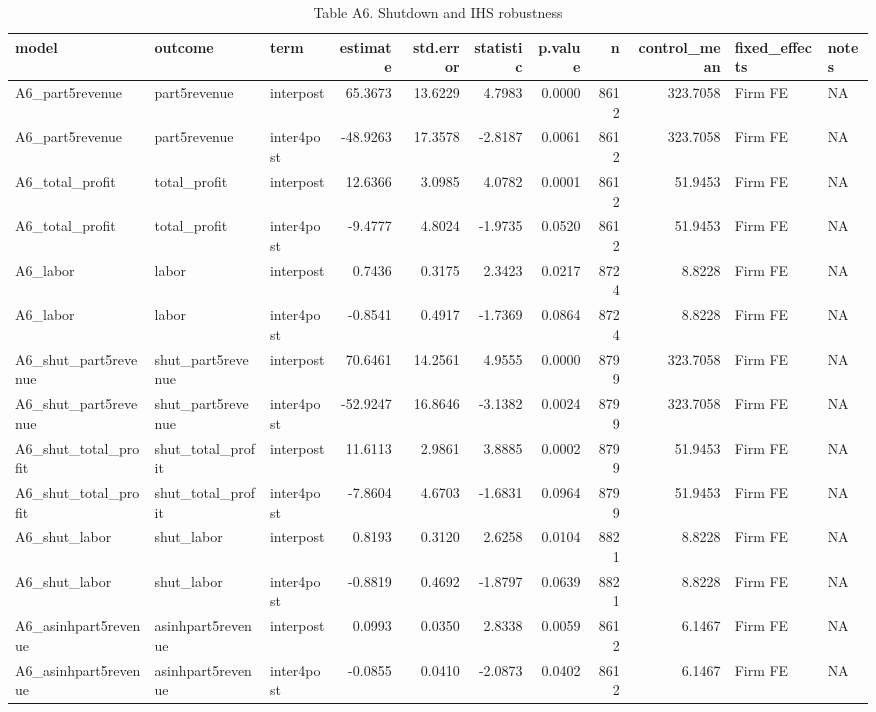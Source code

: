 \begin{table}

\caption{Table A6. Shutdown and IHS robustness}
\centering
\begin{tabular}[t]{lllrrrrrrll}
\toprule
model & outcome & term & estimate & std.error & statistic & p.value & n & control\_mean & fixed\_effects & notes\\
\midrule
A6\_part5revenue & part5revenue & interpost & 65.3673 & 13.6229 & 4.7983 & 0.0000 & 8612 & 323.7058 & Firm FE & NA\\
A6\_part5revenue & part5revenue & inter4post & -48.9263 & 17.3578 & -2.8187 & 0.0061 & 8612 & 323.7058 & Firm FE & NA\\
A6\_total\_profit & total\_profit & interpost & 12.6366 & 3.0985 & 4.0782 & 0.0001 & 8612 & 51.9453 & Firm FE & NA\\
A6\_total\_profit & total\_profit & inter4post & -9.4777 & 4.8024 & -1.9735 & 0.0520 & 8612 & 51.9453 & Firm FE & NA\\
A6\_labor & labor & interpost & 0.7436 & 0.3175 & 2.3423 & 0.0217 & 8724 & 8.8228 & Firm FE & NA\\
\addlinespace
A6\_labor & labor & inter4post & -0.8541 & 0.4917 & -1.7369 & 0.0864 & 8724 & 8.8228 & Firm FE & NA\\
A6\_shut\_part5revenue & shut\_part5revenue & interpost & 70.6461 & 14.2561 & 4.9555 & 0.0000 & 8799 & 323.7058 & Firm FE & NA\\
A6\_shut\_part5revenue & shut\_part5revenue & inter4post & -52.9247 & 16.8646 & -3.1382 & 0.0024 & 8799 & 323.7058 & Firm FE & NA\\
A6\_shut\_total\_profit & shut\_total\_profit & interpost & 11.6113 & 2.9861 & 3.8885 & 0.0002 & 8799 & 51.9453 & Firm FE & NA\\
A6\_shut\_total\_profit & shut\_total\_profit & inter4post & -7.8604 & 4.6703 & -1.6831 & 0.0964 & 8799 & 51.9453 & Firm FE & NA\\
\addlinespace
A6\_shut\_labor & shut\_labor & interpost & 0.8193 & 0.3120 & 2.6258 & 0.0104 & 8821 & 8.8228 & Firm FE & NA\\
A6\_shut\_labor & shut\_labor & inter4post & -0.8819 & 0.4692 & -1.8797 & 0.0639 & 8821 & 8.8228 & Firm FE & NA\\
A6\_asinhpart5revenue & asinhpart5revenue & interpost & 0.0993 & 0.0350 & 2.8338 & 0.0059 & 8612 & 6.1467 & Firm FE & NA\\
A6\_asinhpart5revenue & asinhpart5revenue & inter4post & -0.0855 & 0.0410 & -2.0873 & 0.0402 & 8612 & 6.1467 & Firm FE & NA\\

\end{tabular}
\end{table}
